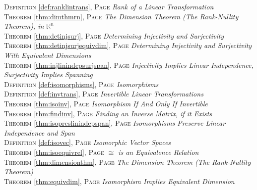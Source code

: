 \begin{multicols}{2}
{         \textsc{Definition} \ref{def:ranklintrans}, \textsc{Page} \pageref{def:ranklintrans} \textit{Rank of a Linear Transformation} \\
         \textsc{Theorem} \ref{thm:dimthmrn}, \textsc{Page} \pageref{thm:dimthmrn} \textit{The Dimension Theorem (The Rank-Nullity Theorem), in \(\mathbb {R}^n\)} \\
         \textsc{Theorem} \ref{thm:detinjsurj}, \textsc{Page} \pageref{thm:detinjsurj} \textit{Determining Injectivity and Surjectivity} \\
         \textsc{Theorem} \ref{thm:detinjsurjequivdim}, \textsc{Page} \pageref{thm:detinjsurjequivdim} \textit{Determining Injectivity and Surjectivity With Equivalent Dimensions} \\
         \textsc{Theorem} \ref{thm:injlinindepsurjspan}, \textsc{Page} \pageref{thm:injlinindepsurjspan} \textit{Injectivity Implies Linear Independence, Surjectivity Implies Spanning} \\
         \textsc{Definition} \ref{def:isomorphisms}, \textsc{Page} \pageref{def:isomorphisms} \textit{Isomorphisms} \\
         \textsc{Definition} \ref{def:invtrans}, \textsc{Page} \pageref{def:invtrans} \textit{Invertible Linear Transformations} \\
         \textsc{Theorem} \ref{thm:isoinv}, \textsc{Page} \pageref{thm:isoinv} \textit{Isomorphism If And Only If Invertible} \\
         \textsc{Theorem} \ref{thm:findinv}, \textsc{Page} \pageref{thm:findinv} \textit{Finding an Inverse Matrix, if it Exists} \\
         \textsc{Theorem} \ref{thm:isopreslinindepspan}, \textsc{Page} \pageref{thm:isopreslinindepspan} \textit{Isomorphisms Preserve Linear Independence and Span} \\
         \textsc{Definition} \ref{def:isovec}, \textsc{Page} \pageref{def:isovec} \textit{Isomorphic Vector Spaces} \\
         \textsc{Theorem} \ref{thm:isoequivrel}, \textsc{Page} \pageref{thm:isoequivrel} \textit{\(\cong \) is an Equivalence Relation} \\
         \textsc{Theorem} \ref{thm:dimensionthm}, \textsc{Page} \pageref{thm:dimensionthm} \textit{The Dimension Theorem (The Rank-Nullity Theorem)} \\
         \textsc{Theorem} \ref{thm:equivdim}, \textsc{Page} \pageref{thm:equivdim} \textit{Isomorphism Implies Equivalent Dimension} \\
}
\end{multicols}
